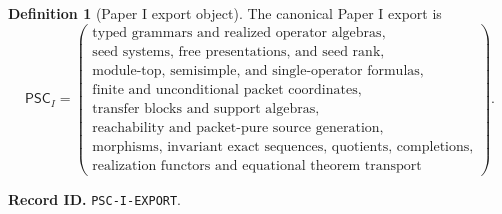 \documentclass[11pt]{article}
\theoremstyle{definition}
\newtheorem{definition}[definition]{Definition}
\theoremstyle{remark}
\newcommand{\RecordID}[1]{\par\smallskip\noindent\begingroup\footnotesize\color{PSCGray}\raggedright\textbf{Record ID.} \nolinkurl{#1}.\par\endgroup}
\begin{document}
\begin{definition}[Paper I export object]
\label{def:paper-one-export}
The canonical Paper I export is
\[
\boxed{
\mathsf{PSC}_I=
\left(
\begin{array}{c}
\text{typed grammars and realized operator algebras},\\
\text{seed systems, free presentations, and seed rank},\\
\text{module-top, semisimple, and single-operator formulas},\\
\text{finite and unconditional packet coordinates},\\
\text{transfer blocks and support algebras},\\
\text{reachability and packet-pure source generation},\\
\text{morphisms, invariant exact sequences, quotients, completions},\\
\text{realization functors and equational theorem transport}
\end{array}
\right).
}
\]
\end{definition}
\RecordID{PSC-I-EXPORT}
\end{document}
